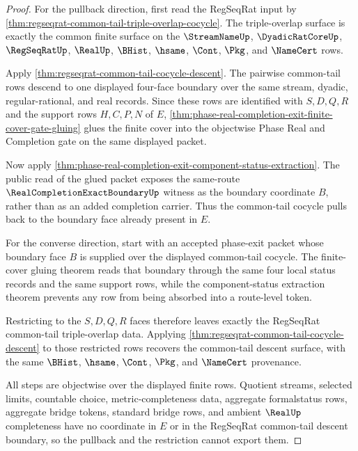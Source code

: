 \begin{proof}
For the pullback direction, first read the RegSeqRat input by \autoref{thm:regseqrat-common-tail-triple-overlap-cocycle}. The triple-overlap surface is exactly the common finite surface on the $\StreamNameUp$, $\DyadicRatCoreUp$, $\RegSeqRatUp$, $\RealUp$, $\BHist$, $\hsame$, $\Cont$, $\Pkg$, and $\NameCert$ rows.

Apply \autoref{thm:regseqrat-common-tail-cocycle-descent}. The pairwise common-tail rows descend to one displayed four-face boundary over the same stream, dyadic, regular-rational, and real records. Since these rows are identified with $S,D,Q,R$ and the support rows $H,C,P,N$ of $E$, \autoref{thm:phase-real-completion-exit-finite-cover-gate-gluing} glues the finite cover into the objectwise Phase Real and Completion gate on the same displayed packet.

Now apply \autoref{thm:phase-real-completion-exit-component-status-extraction}. The public read of the glued packet exposes the same-route $\RealCompletionExactBoundaryUp$ witness as the boundary coordinate $B$, rather than as an added completion carrier. Thus the common-tail cocycle pulls back to the boundary face already present in $E$.

For the converse direction, start with an accepted phase-exit packet whose boundary face $B$ is supplied over the displayed common-tail cocycle. The finite-cover gluing theorem reads that boundary through the same four local status records and the same support rows, while the component-status extraction theorem prevents any row from being absorbed into a route-level token.

Restricting to the $S,D,Q,R$ faces therefore leaves exactly the RegSeqRat common-tail triple-overlap data. Applying \autoref{thm:regseqrat-common-tail-cocycle-descent} to those restricted rows recovers the common-tail descent surface, with the same $\BHist$, $\hsame$, $\Cont$, $\Pkg$, and $\NameCert$ provenance.

All steps are objectwise over the displayed finite rows. Quotient streams, selected limits, countable choice, metric-completeness data, aggregate formalstatus rows, aggregate bridge tokens, standard bridge rows, and ambient $\RealUp$ completeness have no coordinate in $E$ or in the RegSeqRat common-tail descent boundary, so the pullback and the restriction cannot export them.
\end{proof}


